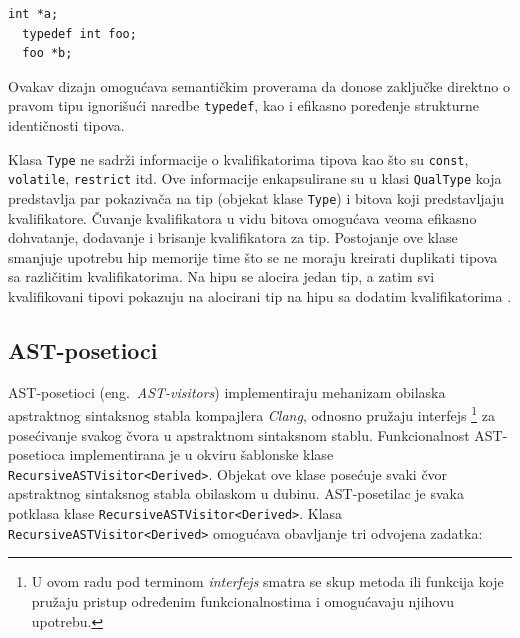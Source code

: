 \documentclass[12pt,oneside]{memoir}
\begin{document}
\begin{lstlisting}[style=customc, caption={Primer kanonskog tipa (\texttt{int *}) i tipa koji nije kanonski (\texttt{foo *}). },label=lst:label5]
  int *a;
  typedef int foo;
  foo *b;
\end{lstlisting}
  Ovakav dizajn omogu\'{c}ava semanti\v{c}kim proverama da donose zaklju\v{c}ke direktno o pravom tipu ignori\v{s}u\'{c}i naredbe \texttt{typedef}, kao i efikasno poređenje strukturne identi\v{c}nosti tipova.

  \par
  Klasa \texttt{Type} ne sadr\v{z}i informacije o kvalifikatorima tipova kao \v{s}to su \texttt{const}, \texttt{volatile}, \texttt{restrict} itd. Ove informacije enkapsulirane su u klasi \texttt{QualType} koja predstavlja par pokaziva\v{c}a na tip (objekat klase \texttt{Type}) i bitova koji predstavljaju
  kvalifikatore. \v{C}uvanje kvalifikatora u vidu bitova omogu\'{c}ava veoma efikasno dohvatanje, dodavanje i brisanje kvalifikatora za tip. Postojanje ove klase smanjuje upotrebu hip memorije time \v{s}to se ne moraju kreirati duplikati tipova sa razli\v{c}itim kvalifikatorima. Na hipu se alocira jedan tip, a zatim 
  svi kvalifikovani tipovi pokazuju na alocirani tip na hipu sa dodatim kvalifikatorima \cite{CFEWebsite}.

\subsection{AST-posetioci}
AST-posetioci (eng.~\textit{AST-visitors}) implementiraju mehanizam obilaska apstraktnog sintaksnog stabla kompajlera \textit{Clang}, odnosno pru\v{z}aju interfejs \footnote{U ovom radu pod terminom \textit{interfejs} smatra se skup metoda ili funkcija koje pru\v{z}aju pristup određenim funkcionalnostima i omogu\'{c}avaju njihovu upotrebu.}
za pose\'{c}ivanje svakog \v{c}vora u apstraktnom sintaksnom stablu.
Funkcionalnost AST-posetioca implementirana je u okviru šablonske klase  \texttt{RecursiveASTVisitor<Deri\-ved>}.
Objekat ove klase posećuje svaki čvor apstraktnog sintaksnog stabla obilaskom u dubinu.
AST-posetilac je svaka potklasa klase \texttt{RecursiveASTVisitor<Der\-ived>}.
Klasa \texttt{RecursiveASTVisitor<\-Derived>} omogu\'{c}ava obavljanje tri odvojena zadatka:
\end{document}
